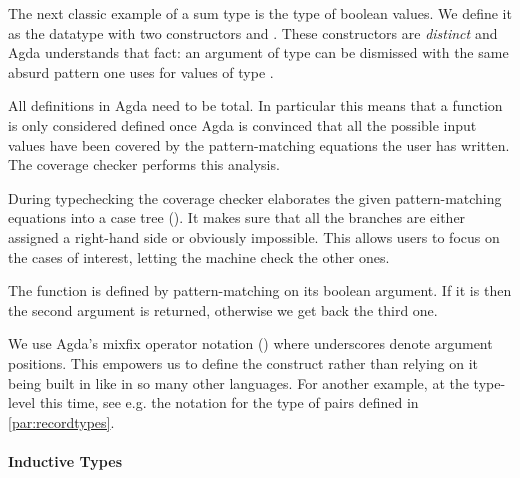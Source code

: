 The next classic example of a sum type is the type of boolean values. We define
it as the datatype with two constructors  and . These
constructors are \emph{distinct} and Agda understands that fact: an argument
of type {  } can be dismissed with the same absurd
pattern one uses for values of type .

\begin{minipage}[t]{0.5\textwidth}
\end{minipage}\begin{minipage}[t]{0.5\textwidth}
\end{minipage}

All definitions in Agda need to be total. In particular this means that a
function is only considered defined once Agda is convinced that all the
possible input values have been covered by the pattern-matching equations
the user has written. The coverage checker performs this analysis.

\begin{feature} During typechecking the coverage checker
elaborates the given pattern-matching equations into a case tree
(\cite{DBLP:journals/jfp/CockxA20}). It makes
sure that all the branches are either assigned a right-hand side or obviously
impossible. This allows users to focus on the cases of interest, letting the
machine check the other ones.
\end{feature}

The function  is defined by pattern-matching on its
boolean argument. If it is  then the second argument is returned,
otherwise we get back the third one.


\begin{feature} We use Agda's mixfix operator notation
(\cite{danielsson2011parsing}) where underscores denote argument positions.
This empowers us to define the  construct rather than
relying on it being built in like in so many other languages. For another
example, at the type-level this time, see e.g. the notation  for
the type of pairs defined in \cref{par:recordtypes}.
\end{feature}

\paragraph{Inductive Types}

